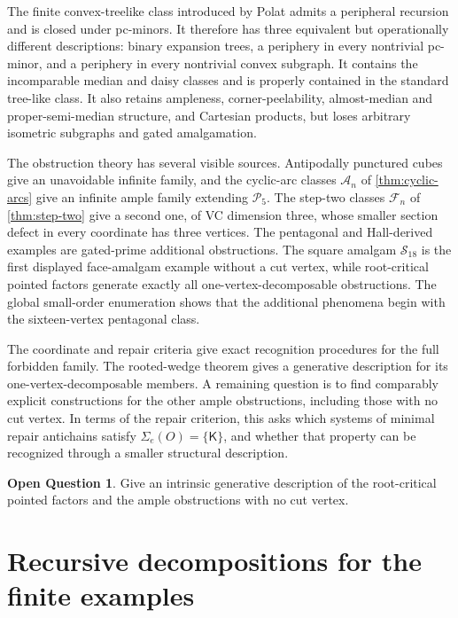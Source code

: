 \documentclass[11pt]{article}
\theoremstyle{definition}
\newtheorem{question}[theorem]{Open Question}
\theoremstyle{remark}
\begin{document}
The finite convex-treelike class introduced by Polat admits a peripheral
recursion and is closed under pc-minors. It therefore has three
equivalent but operationally different descriptions: binary expansion trees,
a periphery in every nontrivial pc-minor, and a periphery in every nontrivial
convex subgraph.  It contains the incomparable median and daisy classes and
is properly contained in the standard tree-like class.  It also retains
ampleness, corner-peelability, almost-median and proper-semi-median structure,
and Cartesian products, but loses arbitrary isometric subgraphs and gated
amalgamation.

The obstruction theory has several visible sources.  Antipodally punctured
cubes give an unavoidable infinite family, and the cyclic-arc classes
\(\mathcal A_n\) of \cref{thm:cyclic-arcs} give an infinite ample family
extending \(\mathcal P_5\).  The step-two classes \(\mathcal F_n\) of
\cref{thm:step-two} give a second one, of VC dimension three, whose smaller
section defect in every coordinate has three vertices.  The pentagonal and Hall-derived
examples are gated-prime additional obstructions.  The square amalgam
\(\mathcal S_{18}\) is the first displayed face-amalgam example without a cut
vertex, while root-critical pointed factors generate exactly all
one-vertex-decomposable obstructions.  The global small-order enumeration
shows that the additional phenomena begin with the sixteen-vertex pentagonal
class.

The coordinate and repair criteria give exact recognition procedures for
the full forbidden family. The rooted-wedge theorem gives a generative
description for its one-vertex-decomposable members. A remaining question
is to find comparably explicit constructions for the other ample
obstructions, including those with no cut vertex. In terms of the repair
criterion, this asks which systems of minimal repair antichains satisfy
\(\Sigma_e(O)=\{\boldsymbol{\mathsf K}\}\), and whether that property can
be recognized through a smaller structural description.

\begin{question}
\label{q:complete-basis}
Give an intrinsic generative description of the root-critical pointed
factors and the ample obstructions with no cut vertex.
\end{question}

\appendix
\section{Recursive decompositions for the finite examples}
\label{app:finite-decompositions}
\end{document}
